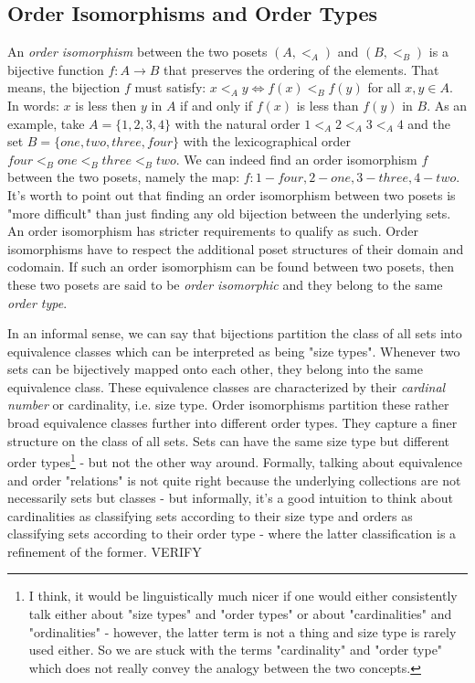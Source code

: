 
\subsection{Order Isomorphisms and Order Types}
An \emph{order isomorphism} between the two posets $(A, <_A)$ and $(B, <_B)$ is a bijective function $f: A \rightarrow B$ that preserves the ordering of the elements. That means, the bijection $f$ must satisfy: $x <_A y \Leftrightarrow f(x) <_B f(y)$ for all $x,y \in A$. In words: $x$ is less then $y$ in $A$ if and only if $f(x)$ is less than $f(y)$ in $B$. As an example, take $A=\{1,2,3,4\}$ with the natural order $1 <_A 2 <_A 3 <_A 4$ and the set $B=\{one,two,three,four\}$ with the lexicographical order $four <_B one <_B three <_B two$. We can indeed find an order isomorphism $f$ between the two posets, namely the map: $f: 1-four, 2-one, 3-three, 4-two$. It's worth to point out that finding an order isomorphism between two posets is "more difficult" than just finding any old bijection between the underlying sets. An order isomorphism has stricter requirements to qualify as such. Order isomorphisms have to respect the additional poset structures of their domain and codomain. If such an order isomorphism can be found between two posets, then these two posets are said to be \emph{order isomorphic} and they belong to the same \emph{order type}.

\medskip
In an informal sense, we can say that bijections partition the class of all sets into equivalence classes which can be interpreted as being "size types". Whenever two sets can be bijectively mapped onto each other, they belong into the same equivalence class. These equivalence classes are characterized by their \emph{cardinal number} or cardinality, i.e. size type. Order isomorphisms partition these rather broad equivalence classes further into different order types. They capture a finer structure on the class of all sets. Sets can have the same size type but different order types\footnote{I think, it would be linguistically much nicer if one would either consistently talk either about "size types" and "order types" or about "cardinalities" and "ordinalities" - however, the latter term is not a thing and size type is rarely used either. So we are stuck with the terms "cardinality" and "order type" which does not really convey the analogy between the two concepts.} - but not the other way around. Formally, talking about equivalence and order "relations" is not quite right because the underlying collections are not necessarily sets but classes - but informally, it's a good intuition to think about cardinalities as classifying sets according to their size type and orders as classifying sets according to their order type - where the latter classification is a refinement of the former. VERIFY

